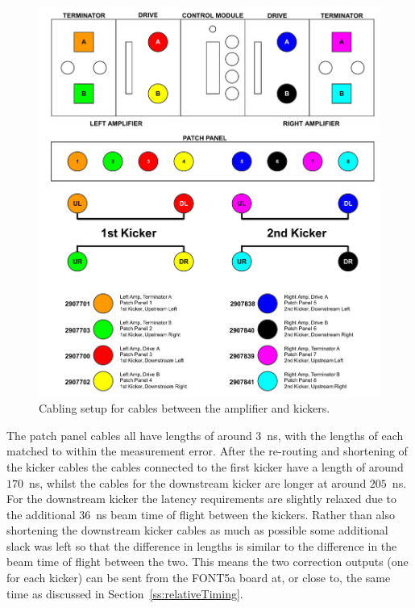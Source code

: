 \begin{figure}
  \centering
  \includegraphics[width=\textwidth]{Figures/commissioning/kickerCables}
  \caption{Cabling setup for cables between the amplifier and kickers.}
  \label{f:kickerCables}
\end{figure}

The patch panel cables all have lengths of around 3~ns, with the lengths of each matched to within the measurement error. After the re-routing and shortening of the kicker cables the cables connected to the first kicker have a length of around \(170\)~ns, whilst the cables for the downstream kicker are longer at around \(205\)~ns. For the downstream kicker the latency requirements are slightly relaxed due to the additional 36~ns beam time of flight between the kickers. Rather than also shortening the downstream kicker cables as much as possible some additional slack was left so that the difference in lengths is similar to the difference in the beam time of flight between the two. This means the two correction outputs (one for each kicker) can be sent from the FONT5a board at, or close to, the same time as discussed in Section~\ref{ss:relativeTiming}.

